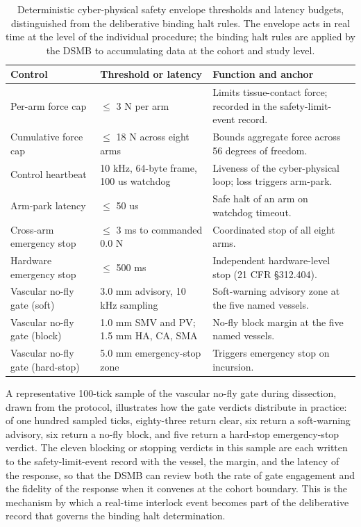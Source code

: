 \begin{table}[htbp]
\centering
\footnotesize
\caption{Deterministic cyber-physical safety envelope thresholds and latency
budgets, distinguished from the deliberative binding halt rules. The envelope acts
in real time at the level of the individual procedure; the binding halt rules are
applied by the DSMB to accumulating data at the cohort and study level.}
\label{tab:halt-envelope}
\begin{tabularx}{\textwidth}{L{4.6cm} L{4.2cm} Y}
\toprule
\textbf{Control} & \textbf{Threshold or latency} & \textbf{Function and anchor} \\
\midrule
Per-arm force cap & $\leq$ 3 N per arm & Limits tissue-contact force; recorded in the safety-limit-event record. \\
Cumulative force cap & $\leq$ 18 N across eight arms & Bounds aggregate force across 56 degrees of freedom. \\
Control heartbeat & 10 kHz, 64-byte frame, 100 us watchdog & Liveness of the cyber-physical loop; loss triggers arm-park. \\
Arm-park latency & $\leq$ 50 us & Safe halt of an arm on watchdog timeout. \\
Cross-arm emergency stop & $\leq$ 3 ms to commanded 0.0 N & Coordinated stop of all eight arms. \\
Hardware emergency stop & $\leq$ 500 ms & Independent hardware-level stop (21 CFR \S 312.404). \\
Vascular no-fly gate (soft) & 3.0 mm advisory, 10 kHz sampling & Soft-warning advisory zone at the five named vessels. \\
Vascular no-fly gate (block) & 1.0 mm SMV and PV; 1.5 mm HA, CA, SMA & No-fly block margin at the five named vessels. \\
Vascular no-fly gate (hard-stop) & 5.0 mm emergency-stop zone & Triggers emergency stop on incursion. \\
\bottomrule
\end{tabularx}
\end{table}


A representative 100-tick sample of the vascular no-fly gate during dissection,
drawn from the protocol, illustrates how the gate verdicts distribute in practice:
of one hundred sampled ticks, eighty-three return clear, six return a soft-warning
advisory, six return a no-fly block, and five return a hard-stop emergency-stop
verdict. The eleven blocking or stopping verdicts in this sample are each written to
the safety-limit-event record with the vessel, the margin, and the latency of the
response, so that the DSMB can review both the rate of gate engagement and the
fidelity of the response when it convenes at the cohort boundary. This is the
mechanism by which a real-time interlock event becomes part of the deliberative
record that governs the binding halt determination.

